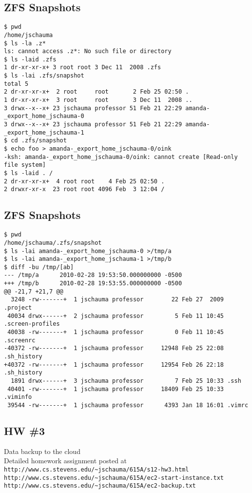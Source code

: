 \documentclass[xga]{xdvislides}
\begin{document}
\subsection{ZFS Snapshots}
\smallish
\begin{verbatim}
$ pwd
/home/jschauma
$ ls -la .z*
ls: cannot access .z*: No such file or directory
$ ls -laid .zfs
1 dr-xr-xr-x+ 3 root root 3 Dec 11  2008 .zfs
$ ls -lai .zfs/snapshot
total 5
2 dr-xr-xr-x+  2 root     root       2 Feb 25 02:50 .
1 dr-xr-xr-x+  3 root     root       3 Dec 11  2008 ..
3 drwx--x--x+ 23 jschauma professor 51 Feb 21 22:29 amanda-_export_home_jschauma-0
3 drwx--x--x+ 23 jschauma professor 51 Feb 21 22:29 amanda-_export_home_jschauma-1
$ cd .zfs/snapshot
$ echo foo > amanda-_export_home_jschauma-0/oink
-ksh: amanda-_export_home_jschauma-0/oink: cannot create [Read-only file system]
$ ls -laid . /
2 dr-xr-xr-x+  4 root root    4 Feb 25 02:50 .
2 drwxr-xr-x  23 root root 4096 Feb  3 12:04 /
\end{verbatim}
\Normalsize

\subsection{ZFS Snapshots}
\smallish
\begin{verbatim}
$ pwd
/home/jschauma/.zfs/snapshot
$ ls -lai amanda-_export_home_jschauma-0 >/tmp/a
$ ls -lai amanda-_export_home_jschauma-1 >/tmp/b
$ diff -bu /tmp/[ab]
--- /tmp/a      2010-02-28 19:53:50.000000000 -0500
+++ /tmp/b      2010-02-28 19:53:55.000000000 -0500
@@ -21,7 +21,7 @@
  3248 -rw-------+  1 jschauma professor        22 Feb 27  2009 .project
 40034 drwx------+  2 jschauma professor         5 Feb 11 10:45 .screen-profiles
 40038 -rw-------+  1 jschauma professor         0 Feb 11 10:45 .screenrc
-40372 -rw-------+  1 jschauma professor     12948 Feb 25 22:08 .sh_history
+40372 -rw-------+  1 jschauma professor     12954 Feb 26 22:18 .sh_history
  1891 drwx------+  3 jschauma professor         7 Feb 25 10:33 .ssh
 40401 -rw-------+  1 jschauma professor     18409 Feb 25 10:33 .viminfo
 39544 -rw-------+  1 jschauma professor      4393 Jan 18 16:01 .vimrc
\end{verbatim}
\Normalsize

\subsection{HW \#3}
Data backup to the cloud \\

Detailed homework assignment posted at
\verb+http://www.cs.stevens.edu/~jschauma/615A/s12-hw3.html+
\\
\verb+http://www.cs.stevens.edu/~jschauma/615A/ec2-start-instance.txt+
\\
\verb+http://www.cs.stevens.edu/~jschauma/615A/ec2-backup.txt+
\end{document}
